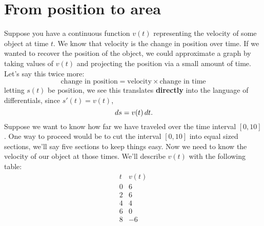 \documentclass{ximera}
\begin{document}
\section{From position to area}

Suppose you have a continuous function $v(t)$ representing the
velocity of some object at time $t$.  We know that velocity is the
change in position over time. If we wanted to recover the position of
the object, we could approximate a graph by taking values of $v(t)$
and projecting the position via a small amount of time. Let's say this
twice more:
\[
\text{change in position} = \text{velocity} \times \text{change in time}
\]
letting $s(t)$ be position, we see this translates \textbf{directly}
into the language of differentials, since $s'(t) = v(t)$, 
\[
\,d s = v(t) \,d t.
\]
Suppose we want to know how far we have traveled over the time interval
$[0,10]$. One way to proceed would be to cut the interval $[0,10]$
into equal sized sections, we'll say five sections to keep things
easy. Now we need to know the velocity of our object at those
times. We'll describe $v(t)$ with the following table:
\[
\begin{array}{c|c}
  t & v(t) \\ \hline
  0 & 6 \\ 
  2 & 6 \\ 
  4 & 4 \\ 
  6 & 0 \\ 
  8 & -6
\end{array}
\]
\end{document}
